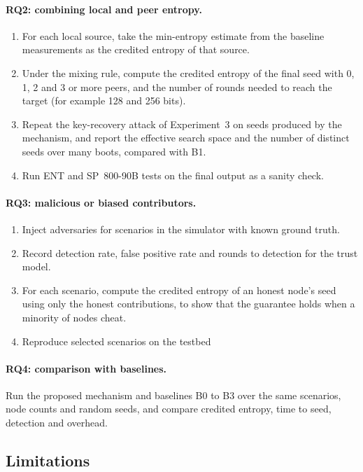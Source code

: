 \documentclass[a4paper, 12pt]{article}
\begin{document}
\paragraph{RQ2: combining local and peer entropy.}
\begin{enumerate}
    \item For each local source, take the min-entropy estimate from the baseline measurements as the credited entropy of that source.
    \item Under the mixing rule, compute the credited entropy of the final seed with 0, 1, 2 and 3 or more peers, and the number of rounds needed to reach the target (for example 128 and 256 bits).
    \item Repeat the key-recovery attack of Experiment~3 on seeds produced by the mechanism, and report the effective search space and the number of distinct seeds over many boots, compared with B1.
    \item Run ENT and SP~800-90B tests on the final output as a sanity check.
\end{enumerate}
 
\paragraph{RQ3: malicious or biased contributors.}
\begin{enumerate}
    \item Inject adversaries for scenarios in the simulator with known ground truth.
    \item Record detection rate, false positive rate and rounds to detection for the trust model.
    \item For each scenario, compute the credited entropy of an honest node's seed using only the honest contributions, to show that the guarantee holds when a minority of nodes cheat.
    \item Reproduce selected scenarios on the testbed
\end{enumerate}
 
\paragraph{RQ4: comparison with baselines.} Run the proposed mechanism and baselines B0 to B3 over the same scenarios, node counts and random seeds, and compare credited entropy, time to seed, detection and overhead.


 
\subsection{Limitations}
 
\end{document}
